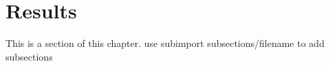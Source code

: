 \chapter{Results}
This is a section of this chapter.
use subimport {subsections/}{filename} to add subsections
